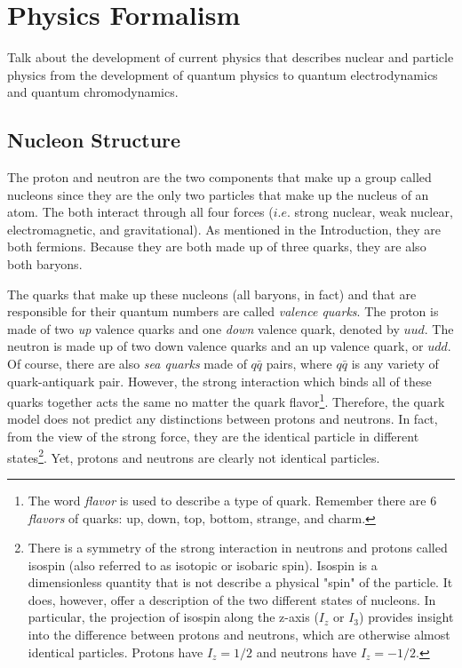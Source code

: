 \chapter{Physics Formalism}
\label{ch:physrev}
Talk about the development of current physics that describes nuclear and particle physics from the development of quantum physics to quantum electrodynamics and quantum chromodynamics.

\section{Nucleon Structure}
The proton and neutron are the two components that make up a group called nucleons since they are the only two particles that make up the nucleus of an atom. The both interact through all four forces ($i.e.$ strong nuclear, weak nuclear, electromagnetic, and gravitational). As mentioned in the Introduction, they are both fermions. Because they are both made up of three quarks, they are also both baryons.

The quarks that make up these nucleons (all baryons, in fact) and that are responsible for their quantum numbers are called \textit{valence quarks}. The proton is made of two \textit{up} valence quarks and one \textit{down} valence quark, denoted by $uud$. The neutron is made up of two down valence quarks and an up valence quark, or $udd$. Of course, there are also \textit{sea quarks} made of $q\bar{q}$ pairs, where $q\bar{q}$ is any variety of quark-antiquark pair. However, the strong interaction which binds all of these quarks together acts the same no matter the quark flavor\footnote{The word \textit{flavor} is used to describe a type of quark. Remember there are 6 \textit{flavors} of quarks: up, down, top, bottom, strange, and charm.}. Therefore, the quark model does not predict any distinctions between protons and neutrons. In fact, from the view of the strong force, they are the identical particle in different states\footnote{There is a symmetry of the strong interaction in neutrons and protons called isospin (also referred to as isotopic or isobaric spin). Isospin is a dimensionless quantity that is not describe a physical "spin" of the particle. It does, however, offer a description of the two different states of nucleons. In particular, the projection of isospin along the z-axis ($I_z$ or $I_3$) provides insight into the difference between protons and neutrons, which are otherwise almost identical particles. Protons have $I_z=1/2$ and neutrons have $I_z=-1/2$.}. Yet, protons and neutrons are clearly not identical particles.

